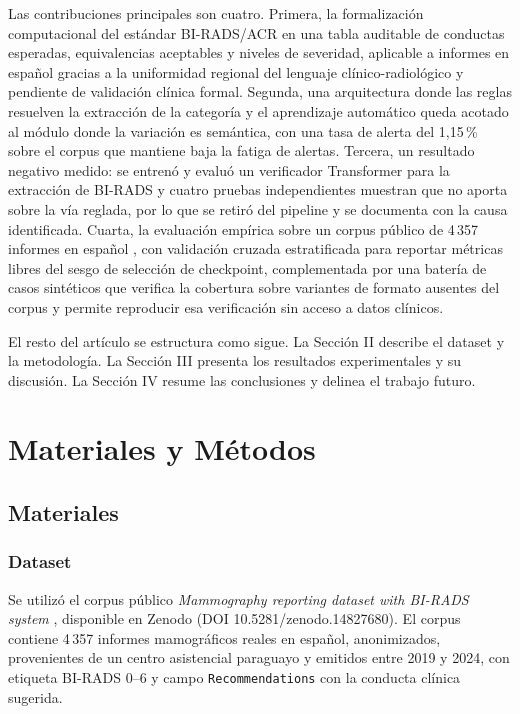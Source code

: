 \documentclass[10pt,journal,a4paper]{IEEEtran}
\begin{document}
Las contribuciones principales son cuatro. Primera, la formalizaci\'on computacional del est\'andar BI-RADS/ACR en una tabla auditable de conductas esperadas, equivalencias aceptables y niveles de severidad, aplicable a informes en espa\~nol gracias a la uniformidad regional del lenguaje cl\'inico-radiol\'ogico y pendiente de validaci\'on cl\'inica formal. Segunda, una arquitectura donde las reglas resuelven la extracci\'on de la categor\'ia y el aprendizaje autom\'atico queda acotado al m\'odulo donde la variaci\'on es sem\'antica, con una tasa de alerta del 1,15\,\% sobre el corpus que mantiene baja la fatiga de alertas. Tercera, un resultado negativo medido: se entren\'o y evalu\'o un verificador Transformer para la extracci\'on de BI-RADS y cuatro pruebas independientes muestran que no aporta sobre la v\'ia reglada, por lo que se retir\'o del pipeline y se documenta con la causa identificada. Cuarta, la evaluaci\'on emp\'irica sobre un corpus p\'ublico de 4\,357 informes en espa\~nol \cite{vazquez2025}, con validaci\'on cruzada estratificada para reportar m\'etricas libres del sesgo de selecci\'on de checkpoint, complementada por una bater\'ia de casos sint\'eticos que verifica la cobertura sobre variantes de formato ausentes del corpus y permite reproducir esa verificaci\'on sin acceso a datos cl\'inicos.

El resto del art\'iculo se estructura como sigue. La Secci\'on II describe el dataset y la metodolog\'ia. La Secci\'on III presenta los resultados experimentales y su discusi\'on. La Secci\'on IV resume las conclusiones y delinea el trabajo futuro.

\section{Materiales y M\'etodos}

\subsection{Materiales}

\subsubsection{Dataset}
Se utiliz\'o el corpus p\'ublico \emph{Mammography reporting dataset with BI-RADS system} \cite{vazquez2025}, disponible en Zenodo (DOI 10.5281/zenodo.14827680). El corpus contiene 4\,357 informes mamogr\'aficos reales en espa\~nol, anonimizados, provenientes de un centro asistencial paraguayo y emitidos entre 2019 y 2024, con etiqueta BI-RADS 0--6 y campo \texttt{Recommendations} con la conducta cl\'inica sugerida.
\end{document}
